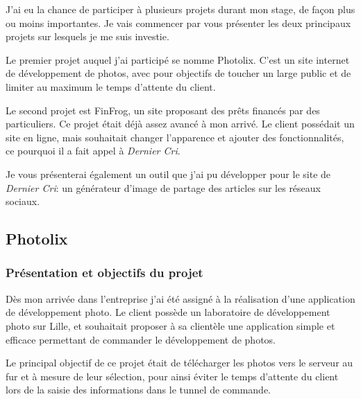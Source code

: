 \documentclass[12pt,a4paper]{article}
\begin{document}
  \bigskip

  J'ai eu la chance de participer à plusieurs projets durant mon stage, de
  façon plus ou moins importantes. Je vais commencer par vous présenter
  les deux principaux projets sur lesquels je me suis investie.

  \bigskip

  Le premier projet auquel j'ai participé se nomme Photolix. C'est un site
  internet de développement de photos, avec pour objectifs de toucher un
  large public et de limiter au maximum le temps d'attente du client.

  \bigskip

  Le second projet est FinFrog, un site proposant des prêts financés par
  des particuliers. Ce projet était déjà assez avancé à mon arrivé. Le
  client possédait un site en ligne, mais souhaitait changer l'apparence
  et ajouter des fonctionnalités, ce pourquoi il a fait appel à
  \emph{Dernier Cri}.

  \bigskip

  Je vous présenterai également un outil que j'ai pu développer pour le
  site de \emph{Dernier Cri}: un générateur d'image de partage des
  articles sur les réseaux sociaux.

  \bigskip

  \subsection{Photolix}\label{photolix}

  \subsubsection{Présentation et objectifs du
  projet}\label{pruxe9sentation-et-objectifs-du-projet}

  \bigskip

  Dès mon arrivée dans l'entreprise j'ai été assigné à la réalisation
  d'une application de développement photo. Le client possède un
  laboratoire de développement photo sur Lille, et souhaitait proposer à
  sa clientèle une application simple et efficace permettant de commander
  le développement de photos.

  \bigskip

  Le principal objectif de ce projet était de télécharger les photos vers
  le serveur au fur et à mesure de leur sélection, pour ainsi éviter le
  temps d'attente du client lors de la saisie des informations dans le
  tunnel de commande.
\end{document}
